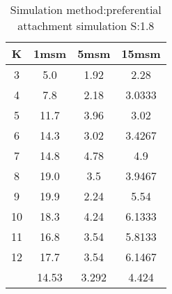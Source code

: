 \begin{table}[H]
\centering
\begin{tabular}{c|ccc}
K &1msm &5msm &15msm\\
\hline
3 & 5.0 & 1.92 & 2.28\\
4 & 7.8 & 2.18 & 3.0333\\
5 & 11.7 & 3.96 & 3.02\\
6 & 14.3 & 3.02 & 3.4267\\
7 & 14.8 & 4.78 & 4.9\\
8 & 19.0 & 3.5 & 3.9467\\
9 & 19.9 & 2.24 & 5.54\\
10 & 18.3 & 4.24 & 6.1333\\
11 & 16.8 & 3.54 & 5.8133\\
12 & 17.7 & 3.54 & 6.1467\\
\hline
& 14.53 & 3.292 & 4.424\\
\end{tabular}
\caption{Simulation method:preferential attachment simulation S:1.8}
\label{tab:s1.8}
\end{table}
